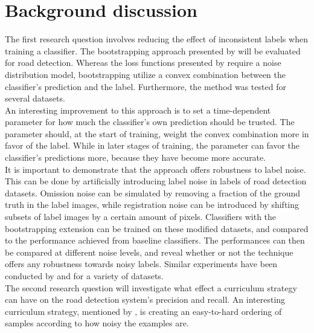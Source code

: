 \section{Background discussion}
\label{sec:backgroundDiscussion}
 The first research question involves reducing the effect of inconsistent labels when training a classifier. The bootstrapping approach presented by \cite{Reed_noisy_labels_bootstrapping} will be evaluated for road detection. Whereas the loss functions presented by \citep{Mnih_aerial_images_noisy} require a noise distribution model,  bootstrapping utilize a  convex combination between the classifier's prediction and the label. Furthermore, the method was tested for several datasets.\\

 An interesting improvement to this approach is to set a time-dependent parameter for how much the classifier's own prediction should be trusted. The parameter should, at the start of training, weight the convex combination more in favor of the label. While in later stages of training, the parameter can favor the classifier's predictions more, because they have become more accurate.\\

It is important to demonstrate that the approach offers robustness to label noise. This can be done by artificially introducing label noise in labels of road detection datasets. Omission noise can be simulated by removing a fraction of the ground truth in the label images, while registration noise can be introduced by shifting subsets of label images by a certain amount of pixels. Classifiers with the bootstrapping extension can be trained on these modified datasets, and compared to the performance achieved from baseline classifiers. The performances can then be compared at different noise levels, and reveal whether or not the technique offers any robustness towards noisy labels. Similar experiments have been conducted by \citep{Sukhbaatar_noisy_network_learning} and \citep{Reed_noisy_labels_bootstrapping} for a variety of datasets. \\

The second research question will investigate what effect a curriculum strategy can have on the road detection system's precision and recall. An interesting curriculum strategy, mentioned by \cite{Bengio_curriculumlearning}, is creating an easy-to-hard ordering of samples according to how noisy the examples are.

